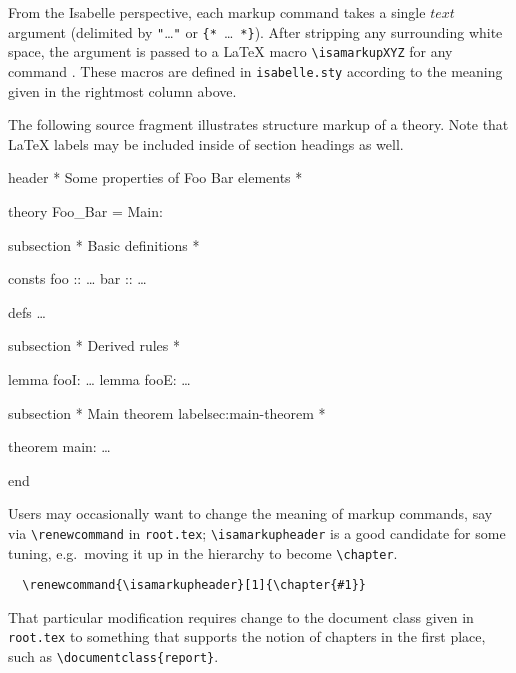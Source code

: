 \begin{isabellebody}
\begin{isamarkuptext}
  From the Isabelle perspective, each markup command takes a single
  $text$ argument (delimited by \verb,",\dots\verb,", or
  \verb,{,\verb,*,~\dots~\verb,*,\verb,},).  After stripping any
  surrounding white space, the argument is passed to a {\LaTeX} macro
  \verb,\isamarkupXYZ, for any command .  These macros
  are defined in \verb,isabelle.sty, according to the meaning given in
  the rightmost column above.

  \medskip The following source fragment illustrates structure markup
  of a theory.  Note that {\LaTeX} labels may be included inside of
  section headings as well.

  \begin{ttbox}
  header {\ttlbrace}* Some properties of Foo Bar elements *{\ttrbrace}

  theory Foo_Bar = Main:

  subsection {\ttlbrace}* Basic definitions *{\ttrbrace}

  consts
    foo :: \dots
    bar :: \dots

  defs \dots

  subsection {\ttlbrace}* Derived rules *{\ttrbrace}

  lemma fooI: \dots
  lemma fooE: \dots

  subsection {\ttlbrace}* Main theorem {\ttback}label{\ttlbrace}sec:main-theorem{\ttrbrace} *{\ttrbrace}

  theorem main: \dots

  end
  \end{ttbox}

  Users may occasionally want to change the meaning of markup
  commands, say via \verb,\renewcommand, in \texttt{root.tex};
  \verb,\isamarkupheader, is a good candidate for some tuning, e.g.\
  moving it up in the hierarchy to become \verb,\chapter,.

\begin{verbatim}
  \renewcommand{\isamarkupheader}[1]{\chapter{#1}}
\end{verbatim}

  \noindent That particular modification requires change to the
  document class given in \texttt{root.tex} to something that supports
  the notion of chapters in the first place, such as
  \verb,\documentclass{report},.


\end{isamarkuptext}
\end{isabellebody}
